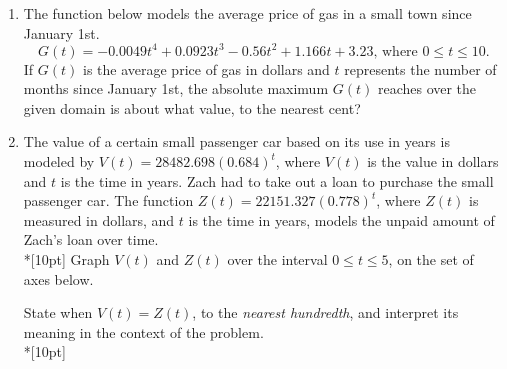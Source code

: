 \documentclass[12pt, twoside]{article}
\begin{document}
\begin{enumerate}
\item The function below models the average price of gas in a small town since January 1st.
    \[G(t)=-0.0049t^4 + 0.0923t^3 - 0.56t^2 +1.166t+3.23 \text{, where } 0 \leq t \leq 10.\]
    If $G(t)$ is the average price of gas in dollars and $t$ represents the number of months since January 1st, the absolute maximum $G(t)$ reaches over the given domain is about what value, to the nearest cent? \\[1cm]%

\newpage
 \item The value of a certain small passenger car based on its use in years is modeled by $V(t) =28482.698(0.684)^t$, where $V(t)$ is the value in dollars and $t$ is the time in years. Zach had to take out a loan to purchase the small passenger car. The function $Z(t)=22151.327(0.778)^t$, where $Z(t)$ is measured in dollars, and $t$ is the time in years, models the unpaid amount of Zach's loan over time.\\*[10pt]
Graph $V(t)$ and $Z(t)$ over the interval $0 \leq t \leq 5$, on the set of axes below.
\begin{center}
\end{center}
State when $V(t)=Z(t)$, to the \emph{nearest hundredth}, and interpret its meaning in the context of the problem.\\*[10pt]


\end{enumerate}
\end{document}
